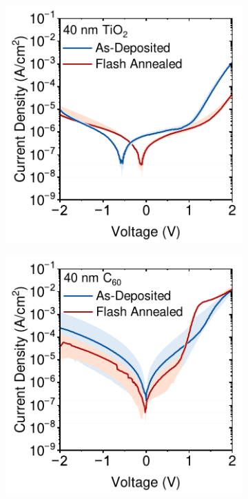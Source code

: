\begin{figure}[htbp]
    \centering
    \begin{subfigure}[t]{0.4\textwidth}
        \centering
        \includegraphics[width=\textwidth]{chapters/material_properties/images/TiO2-Compare.pdf} 
        \caption{}
        \label{fig:ch2:tio2_compare}
    \end{subfigure}
    \hfill
    \begin{subfigure}[t]{0.4\textwidth}
        \centering
        \includegraphics[width=\textwidth]{chapters/material_properties/images/C60-Compare.pdf} %
        \caption{}
        \label{fig:ch2:c60_compare}
    \end{subfigure}



\end{figure}
